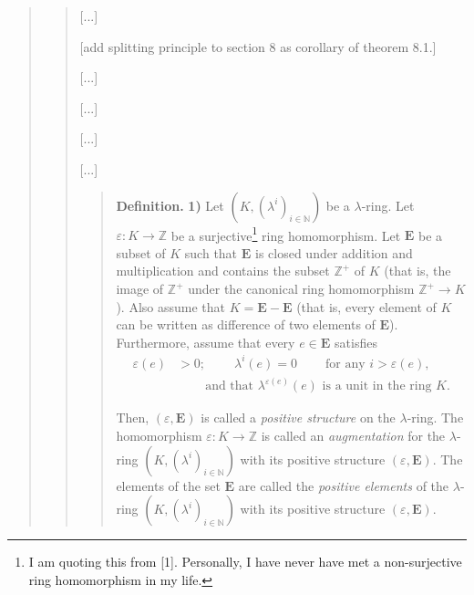 \documentclass[12pt,final,notitlepage,onecolumn,german]{article}%
\begin{document}
\begin{quote}
\begin{quote}
[...]

[add splitting principle to section 8 as corollary of theorem 8.1.]

[...]

\begin{center}
\end{center}

[...]

\begin{center}
\end{center}

[...]

\begin{center}
\end{center}

[...]

\begin{quote}
\textbf{Definition.} \textbf{1)} Let $\left(  K,\left(  \lambda^{i}\right)
_{i\in\mathbb{N}}\right)  $ be a $\lambda$-ring. Let $\varepsilon
:K\rightarrow\mathbb{Z}$ be a surjective\footnote{I am quoting this from [1].
Personally, I have never have met a non-surjective ring homomorphism in my
life.} ring homomorphism. Let $\mathbf{E}$ be a subset of $K$ such that
$\mathbf{E}$ is closed under addition and multiplication and contains the
subset $\mathbb{Z}^{+}$ of $K$ (that is, the image of $\mathbb{Z}^{+}$ under
the canonical ring homomorphism $\mathbb{Z}^{+}\rightarrow K$). Also assume
that $K=\mathbf{E}-\mathbf{E}$ (that is, every element of $K$ can be written
as difference of two elements of $\mathbf{E}$). Furthermore, assume that every
$e\in\mathbf{E}$ satisfies%
\begin{align*}
\varepsilon\left(  e\right)   &  >0;\ \ \ \ \ \ \ \ \ \ \lambda^{i}\left(
e\right)  =0\ \ \ \ \ \ \ \ \ \ \text{for any }i>\varepsilon\left(  e\right)
,\\
&  \ \ \ \ \ \ \ \ \ \ \text{and that }\lambda^{\varepsilon\left(  e\right)
}\left(  e\right)  \text{ is a unit in the ring }K.
\end{align*}


Then, $\left(  \varepsilon,\mathbf{E}\right)  $ is called a \textit{positive
structure} on the $\lambda$-ring. The homomorphism $\varepsilon:K\rightarrow
\mathbb{Z}$ is called an \textit{augmentation} for the $\lambda$-ring $\left(
K,\left(  \lambda^{i}\right)  _{i\in\mathbb{N}}\right)  $ with its positive
structure $\left(  \varepsilon,\mathbf{E}\right)  $. The elements of the set
$\mathbf{E}$ are called the \textit{positive elements} of the $\lambda$-ring
$\left(  K,\left(  \lambda^{i}\right)  _{i\in\mathbb{N}}\right)  $ with its
positive structure $\left(  \varepsilon,\mathbf{E}\right)  $.


\end{quote}
\end{quote}
\end{quote}
\end{document}
